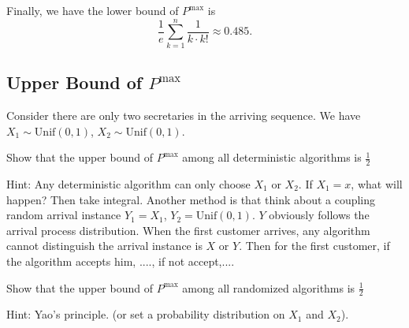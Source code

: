 Finally, we have the lower bound of $P^{\text{max}}$ is 
\[
\frac{1}{e}\sum_{k=1}^{n}\frac{1}{k \cdot k!} \approx 0.485.
\]

\subsection{Upper Bound of $P^{\text{max}}$}

Consider there are only two secretaries in the arriving sequence. We have $X_1 \sim \text{Unif}(0,1)$, $X_2 \sim \text{Unif}(0,1)$. 

{\color{red} Show that the upper bound of $P^{\text{max}}$ among all deterministic algorithms is $\frac{1}{2}$}

{\color{blue} Hint: Any deterministic algorithm can only choose $X_1$ or $X_2$. If $X_1=x$, what will happen? Then take integral. Another method is that think about a coupling random arrival instance $Y_1=X_1$, $Y_2=\text{Unif}(0,1)$. $Y$ obviously follows the arrival process distribution. When the first customer arrives, any algorithm cannot distinguish the arrival instance is $X$ or $Y$. Then for the first customer, if the algorithm accepts him, ...., if not accept,....}


{\color{red}  Show that the upper bound of $P^{\text{max}}$ among all randomized algorithms is $\frac{1}{2}$}

{\color{blue} Hint: Yao's principle. (or set a probability distribution on $X_1$ and $X_2$)}.













